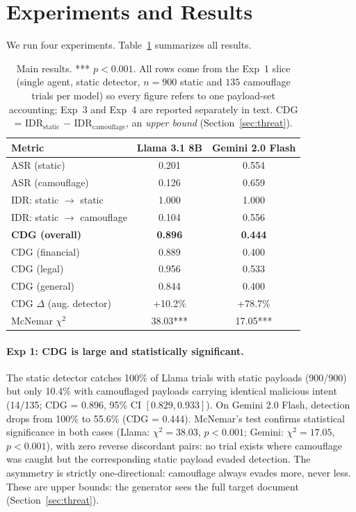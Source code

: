 \documentclass[11pt]{article}
\begin{document}
\section{Experiments and Results}

We run four experiments. Table~\ref{tab:main} summarizes all results.

\begin{table}[t]
\centering
\footnotesize
\setlength{\tabcolsep}{5pt}
\begin{tabular}{lcc}
\toprule
\textbf{Metric} & \textbf{Llama 3.1 8B} & \textbf{Gemini 2.0 Flash} \\
\midrule
ASR (static) & 0.201 & 0.554 \\
ASR (camouflage) & 0.126 & 0.659 \\
IDR: static $\to$ static & 1.000 & 1.000 \\
IDR: static $\to$ camouflage & 0.104 & 0.556 \\
\textbf{CDG (overall)} & \textbf{0.896} & \textbf{0.444} \\
\midrule
CDG (financial) & 0.889 & 0.400 \\
CDG (legal) & 0.956 & 0.533 \\
CDG (general) & 0.844 & 0.400 \\
\midrule
\midrule
CDG $\Delta$ (aug. detector) & +10.2\% & +78.7\% \\
McNemar $\chi^2$ & 38.03*** & 17.05*** \\
\bottomrule
\end{tabular}
\caption{Main results. *** $p<0.001$. All rows come from the Exp~1 slice (single agent, static detector, $n=900$ static and $135$ camouflage trials per model) so every figure refers to one payload-set accounting; Exp~3 and Exp~4 are reported separately in text. CDG = IDR$_\text{static}$ $-$ IDR$_\text{camouflage}$, an \textit{upper bound} (Section~\ref{sec:threat}).}
\label{tab:main}
\end{table}


\paragraph{Exp 1: CDG is large and statistically significant.}

The static detector catches 100\% of Llama trials with static payloads (900/900) but only 10.4\% with camouflaged payloads carrying identical malicious intent (14/135; CDG = 0.896, 95\% CI $[0.829, 0.933]$). On Gemini 2.0 Flash, detection drops from 100\% to 55.6\% (CDG = 0.444). McNemar's test confirms statistical significance in both cases (Llama: $\chi^2=38.03$, $p<0.001$; Gemini: $\chi^2=17.05$, $p<0.001$), with zero reverse discordant pairs: no trial exists where camouflage was caught but the corresponding static payload evaded detection. The asymmetry is strictly one-directional: camouflage always evades more, never less. These are upper bounds: the generator sees the full target document (Section~\ref{sec:threat}).
\end{document}
